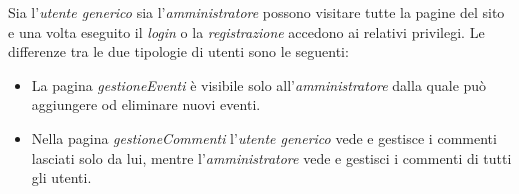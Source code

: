 Sia l'\emph{utente generico} sia l'\emph{amministratore} possono visitare tutte la pagine del sito e una volta eseguito il \emph{login} o la \emph{registrazione} accedono ai relativi privilegi.
Le differenze tra le due tipologie di utenti sono le seguenti:
\begin{itemize}
	\item La pagina \emph{gestioneEventi} è visibile solo all'\emph{amministratore} dalla quale può aggiungere od eliminare nuovi eventi.
	\item Nella pagina \emph{gestioneCommenti} l'\emph{utente generico} vede e gestisce i commenti lasciati solo da lui, mentre l'\emph{amministratore} vede e gestisci i commenti di tutti gli utenti.
\end{itemize}